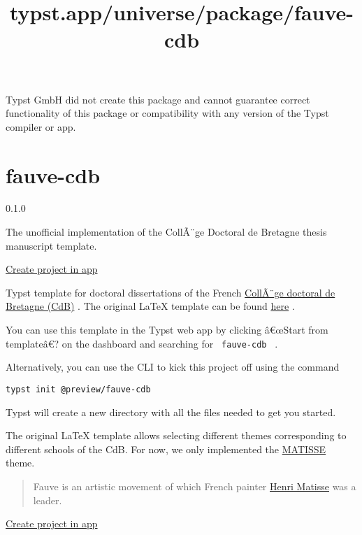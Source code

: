 Typst GmbH did not create this package and cannot guarantee correct
functionality of this package or compatibility with any version of the
Typst compiler or app.


\title{typst.app/universe/package/fauve-cdb}

\label{banner}
\label{template-thumbnail}

\section{fauve-cdb}\label{fauve-cdb}

{ 0.1.0 }

The unofficial implementation of the CollÃ¨ge Doctoral de Bretagne
thesis manuscript template.

\href{/app?template=fauve-cdb&version=0.1.0}{Create project in app}

\label{readme}
Typst template for doctoral dissertations of the French
\href{https://www.doctorat-bretagne.fr/}{CollÃ¨ge doctoral de Bretagne
(CdB)} . The original LaTeX template can be found
\href{https://gitlab.com/ed-matisse/latex-template}{here} .

You can use this template in the Typst web app by clicking â€œStart from
templateâ€? on the dashboard and searching for \texttt{\ fauve-cdb\ } .

Alternatively, you can use the CLI to kick this project off using the
command

\begin{verbatim}
typst init @preview/fauve-cdb
\end{verbatim}

Typst will create a new directory with all the files needed to get you
started.

The original LaTeX template allows selecting different themes
corresponding to different schools of the CdB. For now, we only
implemented the \href{https://ed-matisse.doctorat-bretagne.fr/}{MATISSE}
theme.

\begin{quote}
Fauve is an artistic movement of which French painter
\href{https://en.wikipedia.org/wiki/Henri_Matisse}{Henri Matisse} was a
leader.
\end{quote}

\href{/app?template=fauve-cdb&version=0.1.0}{Create project in app}

